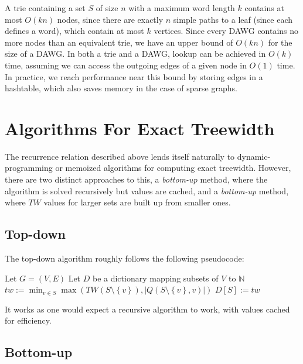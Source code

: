 \documentclass{article}
\newcommand\abs[1]{\left|#1\right|}
\newcommand\set[1]{\left\{#1\right\}}
\newcommand\natnum{\mathbb{N}}
\begin{document}
A trie containing a set $S$ of size $n$ with a maximum word length $k$ contains at most $O(kn)$ nodes,
since there are exactly $n$ simple paths to a leaf (since each defines a word), 
which contain at most $k$ vertices.
Since every DAWG contains no more nodes than an equivalent trie, 
we have an upper bound of $O(kn)$ for the size of a DAWG.
In both a trie and a DAWG, lookup can be achieved in $O(k)$ time,
assuming we can access the outgoing edges of a given node in $O(1)$ time.
In practice, we reach performance near this bound by storing edges
in a hashtable, which also saves memory in the case of sparse graphs.

\section{Algorithms For Exact Treewidth}

The recurrence relation described above lends itself naturally to dynamic-programming
or memoized algorithms for computing exact treewidth. However, there are two distinct approaches to this,
a \textit{bottom-up} method, where the algorithm is solved recursively but values are cached, 
and a \textit{bottom-up} method, where $TW$ values for larger sets are built up from smaller ones.

\subsection{Top-down}

The top-down algorithm roughly follows the following pseudocode: 

\begin{algorithm}[H]
    Let $G = (V,E)$\;
    Let $D$ be a dictionary mapping subsets of $V$ to $\natnum$\;
    {
        \If{$\abs{S} = 0$}
        {
            \Return{$-\infty$}
        }
        {
        }
        \Else
        {
           $tw := \min_{v \in S} \max(TW(S \setminus \set{v}), \abs{Q(S \setminus \set{v}, v)})$\;
           $D[S] := tw$\;
           \;
        }
    }
    \;

\end{algorithm}

It works as one would expect a recursive algorithm to work, with values cached for efficiency.


\subsection{Bottom-up}
\end{document}
